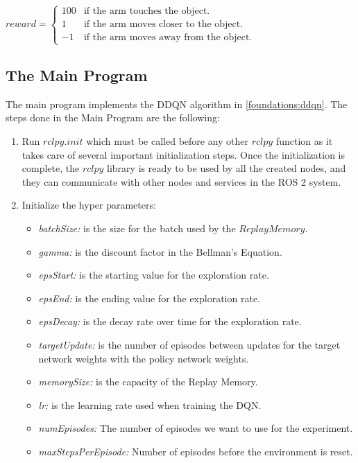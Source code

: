 \documentclass[12pt,oneside]{article}
\begin{document}
\begin{enumerate}
$reward = 
 \begin{cases} 
 	100 	& \text{if the arm touches the object.} \\ 
 	1 		& \text{if the arm moves closer to the object.} \\ 
 	-1 		& \text{if the arm moves away from the object.} 
 \end{cases}$
\end{enumerate}


\subsection{The Main Program}\label{main-program}
The main program implements the DDQN algorithm in \ref{foundations:ddqn}. The steps done in the Main Program are the following:
\begin{enumerate}
\item Run $rclpy.init$ which must be called before any other $rclpy$ function as it takes care of several important initialization steps. Once the initialization is complete, the $rclpy$ library is ready to be used by all the created nodes, and they can communicate with other nodes and services in the ROS 2 system.
\item  Initialize the hyper parameters:
\begin{itemize}
\item \textit{batchSize:} is the size for the batch used by the $ReplayMemory$.
\item \textit{gamma:} is the discount factor in the Bellman's Equation.
\item \textit{epsStart:} is the starting value for the exploration rate.
\item \textit{epsEnd: } is the ending value for the exploration rate.
\item \textit{epsDecay:} is the decay rate over time for the exploration rate.
\item \textit{targetUpdate:} is the number of episodes between updates for the target network weights with the policy network weights.
\item \textit{memorySize:} is the capacity of the Replay Memory.
\item \textit{lr:} is the learning rate used when training the DQN.
\item \textit{numEpisodes:} The number of episodes we want to use for the experiment.
\item \textit{maxStepsPerEpisode:} Number of episodes before the environment is reset.
\end{itemize}

\end{enumerate}
\end{document}

